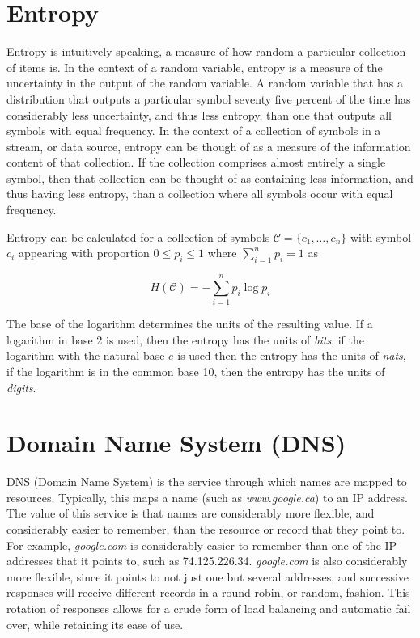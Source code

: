 \documentclass[12pt]{report}
\theoremstyle{remark}
\theoremstyle{definition}
\theoremstyle{definition}
\theoremstyle{definition}
\begin{document}
\section{Entropy} Entropy is intuitively speaking, a measure of how random a
particular collection of items is. In the context of a random variable, entropy
is a measure of the uncertainty in the output of the random variable. A random
variable that has a distribution that outputs a particular symbol seventy five
percent of the time has considerably less uncertainty, and thus less entropy,
than one that outputs all symbols with equal frequency. In the context of a
collection of symbols in a stream, or data source, entropy can be though of as a
measure of the information content of that collection. If the collection
comprises almost entirely a single symbol, then that collection can be thought
of as containing less information, and thus having less entropy, than a
collection where all symbols occur with equal frequency.

Entropy can be calculated for a collection of symbols
$\mathcal{C}=\{c_1,\ldots,c_n\}$ with symbol $c_i$ appearing with proportion
$0\leq p_i\leq 1$ where $\sum_{i=1}^n{p_i}=1$ as

 \[H(\mathcal{C})=-\sum_{i=1}^n{p_i \log{p_i}}\]

The base of the logarithm determines the units of the resulting value. If a
logarithm in base 2 is used, then the entropy has the units of \emph{bits}, if
the logarithm with the natural base $e$ is used then the entropy has the units
of \emph{nats}, if the logarithm is in the common base 10, then the entropy has
the units of \emph{digits}.

\section{Domain Name System (DNS)}

DNS (Domain Name System) is the service through which names are mapped to
resources. Typically, this maps a name (such as \emph{www.google.ca}) to an IP
address. The value of this service is that names are considerably more flexible,
and considerably easier to remember, than the resource or record that they point
to. For example, \emph{google.com} is considerably easier to remember than one
of the IP addresses that it points to, such as 74.125.226.34. \emph{google.com}
is also considerably more flexible, since it points to not just one but several
addresses, and successive responses will receive different records in a
round-robin, or random, fashion. This rotation of responses allows for a crude
form of load balancing and automatic fail over, while retaining its ease of use.
\end{document}

